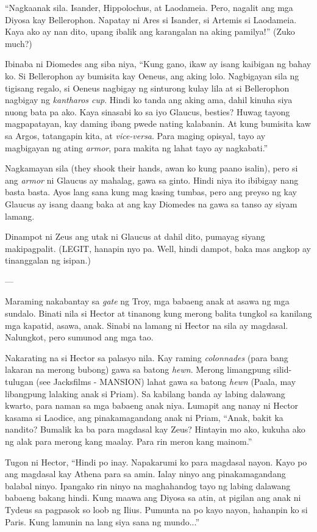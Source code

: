 \documentclass[12pt,letterpaper]{report}
\begin{document}
``Nagkaanak sila. Isander, Hippolochus, at Laodameia. Pero, nagalit ang mga Diyosa kay Bellerophon. Napatay ni Ares si Isander, si Artemis si Laodameia. Kaya ako ay nan dito, upang ibalik ang karangalan na aking pamilya!'' (Zuko much?)

Ibinaba ni Diomedes ang siba niya, ``Kung gano, ikaw ay isang kaibigan ng bahay ko. Si Bellerophon ay bumisita kay Oeneus, ang aking lolo. Nagbigayan sila ng tigisang regalo, si Oeneus nagbigay ng sinturong kulay lila at si Bellerophon nagbigay ng \textit{kantharos cup}. Hindi ko tanda ang aking ama, dahil kinuha siya nuong bata pa ako. Kaya sinasabi ko sa iyo Glaucus, besties? Huwag tayong magpapatayan, kay daming ibang pwede nating kalabanin. At kung bumisita kaw sa Argos, tatangapin kita, at \textit{vice-versa}. Para maging opisyal, tayo ay magbigayan ng ating \textit{armor}, para makita ng lahat tayo ay nagkabati.''

Nagkamayan sila (they shook their hands, awan ko kung paano isalin), pero si ang \textit{armor} ni Glaucus ay mahalag, gawa sa ginto. Hindi niya ito ibibigay nang basta basta. Ayos lang sana kung mag kasing tumbas, pero ang preyso ng kay Glaucus ay isang daang baka at ang kay Diomedes na gawa sa tanso ay siyam lamang.

Dinampot ni Zeus ang utak ni Glaucus at dahil dito, pumayag siyang makipagpalit. (LEGIT, hanapin nyo pa. Well, hindi dampot, baka mas angkop ay tinanggalan ng isipan.)

---

Maraming nakabantay sa \textit{gate} ng Troy, mga babaeng anak at asawa ng mga sundalo. Binati nila si Hector at tinanong kung merong balita tungkol sa kanilang mga kapatid, asawa, anak. Sinabi na lamang ni Hector na sila ay magdasal. Nalungkot, pero sumunod ang mga tao.

Nakarating na si Hector sa palasyo nila. Kay raming \textit{colonnades} (para bang lakaran na merong bubong) gawa sa batong \textit{hewn}. Merong limangpung silid-tulugan (see Jacksfilms - MANSION) lahat gawa sa batong \textit{hewn} (Paala, may libangpung lalaking anak si Priam). Sa kabilang banda ay labing dalawang kwarto, para naman sa mga babaeng anak niya. Lumapit ang nanay ni Hector kasama si Laodice, ang pinakamagandang anak ni Priam, ``Anak, bakit ka nandito? Bumalik ka ba para magdasal kay Zeus? Hintayin mo ako, kukuha ako ng alak para merong kang maalay. Para rin meron kang mainom.''

Tugon ni Hector, ``Hindi po inay. Napakarumi ko para magdasal nayon. Kayo po ang magdasal kay Athena para sa amin. Ialay ninyo ang pinakamagandang balabal ninyo. Ipangako rin ninyo na maghahandog tayo ng labing dalawang babaeng bakang hindi. Kung maawa ang Diyosa sa atin, at pigilan ang anak ni Tydeus sa pagpasok so loob ng Ilius. Pumunta na po kayo nayon, hahanpin ko si Paris. Kung lamunin na lang siya sana ng mundo...'' 
\end{document}
